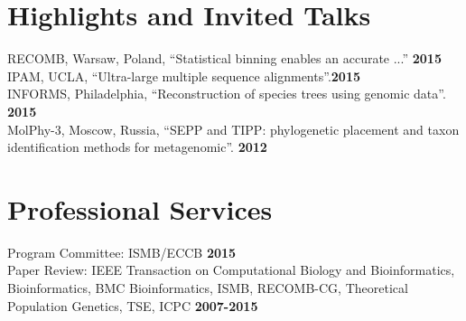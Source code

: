 \documentclass[margin,line,letterpaper]{resume}
\begin{document}
\begin{resume}
    
    
        \section{\mysidestyle Highlights and Invited Talks}
         RECOMB, Warsaw, Poland, ``Statistical binning enables an accurate ...''   \hfill \textbf{2015}\\
         IPAM, UCLA, ``Ultra-large multiple sequence alignments''.\hfill \textbf{2015}\\
         INFORMS, Philadelphia, ``Reconstruction of species trees using genomic data''.   \hfill \textbf{2015}\\
         MolPhy-3, Moscow, Russia, ``SEPP and TIPP: phylogenetic placement and taxon identification methods for metagenomic''. \hfill \textbf{2012}\vspace{1mm}
    \section{\mysidestyle Professional Services}
    Program Committee: ISMB/ECCB  \hfill \textbf{2015}\vspace{1mm}\\
    Paper Review:  IEEE Transaction on Computational Biology and Bioinformatics, Bioinformatics, BMC Bioinformatics, ISMB, RECOMB-CG, Theoretical Population Genetics, TSE, ICPC    \hfill \textbf{2007-2015}\vspace{1mm}\\


\end{resume}
\end{document}
